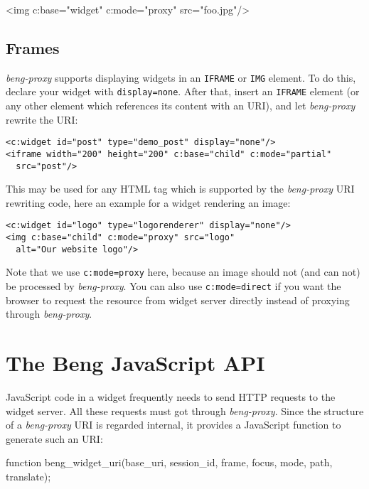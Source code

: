 \documentclass[a4paper,12pt]{article}
\begin{document}
\begin{verbatim*}
<img c:base="widget" c:mode="proxy" src="foo.jpg"/>
\end{verbatim*}

\subsection{Frames}
\label{frames}

\emph{beng-proxy} supports displaying widgets in an \texttt{IFRAME} or
\texttt{IMG} element.  To do this, declare your widget with
\texttt{display=none}.  After that, insert an \texttt{IFRAME} element
(or any other element which references its content with an URI), and
let \emph{beng-proxy} rewrite the URI:

\begin{verbatim}
<c:widget id="post" type="demo_post" display="none"/>
<iframe width="200" height="200" c:base="child" c:mode="partial"
  src="post"/>
\end{verbatim}

This may be used for any HTML tag which is supported by the
\emph{beng-proxy} URI rewriting code, here an example for a widget
rendering an image:

\begin{verbatim}
<c:widget id="logo" type="logorenderer" display="none"/>
<img c:base="child" c:mode="proxy" src="logo"
  alt="Our website logo"/>
\end{verbatim}

Note that we use \texttt{c:mode=proxy} here, because an image should
not (and can not) be processed by \emph{beng-proxy}.  You can also use
\texttt{c:mode=direct} if you want the browser to request the resource
from widget server directly instead of proxying through
\emph{beng-proxy}.


\section{The Beng JavaScript API}

JavaScript code in a widget frequently needs to send HTTP requests to
the widget server.  All these requests must got through
\emph{beng-proxy}.  Since the structure of a \emph{beng-proxy} URI is
regarded internal, it provides a JavaScript function to generate such
an URI:

\begin{verbatim*}
function beng_widget_uri(base_uri, session_id, frame, focus, mode,
                         path, translate);
\end{verbatim*}
\end{document}
